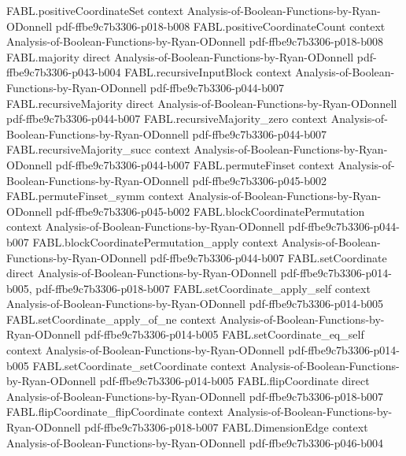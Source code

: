 \begin{theorem}
\proofstep
  {FABL.positiveCoordinateSet}
  {context}
  {Analysis-of-Boolean-Functions-by-Ryan-ODonnell}
  {pdf-ffbe9c7b3306-p018-b008}
\proofstep
  {FABL.positiveCoordinateCount}
  {context}
  {Analysis-of-Boolean-Functions-by-Ryan-ODonnell}
  {pdf-ffbe9c7b3306-p018-b008}
\proofstep
  {FABL.majority}
  {direct}
  {Analysis-of-Boolean-Functions-by-Ryan-ODonnell}
  {pdf-ffbe9c7b3306-p043-b004}
\proofstep
  {FABL.recursiveInputBlock}
  {context}
  {Analysis-of-Boolean-Functions-by-Ryan-ODonnell}
  {pdf-ffbe9c7b3306-p044-b007}
\proofstep
  {FABL.recursiveMajority}
  {direct}
  {Analysis-of-Boolean-Functions-by-Ryan-ODonnell}
  {pdf-ffbe9c7b3306-p044-b007}
\proofstep
  {FABL.recursiveMajority_zero}
  {context}
  {Analysis-of-Boolean-Functions-by-Ryan-ODonnell}
  {pdf-ffbe9c7b3306-p044-b007}
\proofstep
  {FABL.recursiveMajority_succ}
  {context}
  {Analysis-of-Boolean-Functions-by-Ryan-ODonnell}
  {pdf-ffbe9c7b3306-p044-b007}
\proofstep
  {FABL.permuteFinset}
  {context}
  {Analysis-of-Boolean-Functions-by-Ryan-ODonnell}
  {pdf-ffbe9c7b3306-p045-b002}
\proofstep
  {FABL.permuteFinset_symm}
  {context}
  {Analysis-of-Boolean-Functions-by-Ryan-ODonnell}
  {pdf-ffbe9c7b3306-p045-b002}
\proofstep
  {FABL.blockCoordinatePermutation}
  {context}
  {Analysis-of-Boolean-Functions-by-Ryan-ODonnell}
  {pdf-ffbe9c7b3306-p044-b007}
\proofstep
  {FABL.blockCoordinatePermutation_apply}
  {context}
  {Analysis-of-Boolean-Functions-by-Ryan-ODonnell}
  {pdf-ffbe9c7b3306-p044-b007}
\proofstep
  {FABL.setCoordinate}
  {direct}
  {Analysis-of-Boolean-Functions-by-Ryan-ODonnell}
  {pdf-ffbe9c7b3306-p014-b005,
    pdf-ffbe9c7b3306-p018-b007}
\proofstep
  {FABL.setCoordinate_apply_self}
  {context}
  {Analysis-of-Boolean-Functions-by-Ryan-ODonnell}
  {pdf-ffbe9c7b3306-p014-b005}
\proofstep
  {FABL.setCoordinate_apply_of_ne}
  {context}
  {Analysis-of-Boolean-Functions-by-Ryan-ODonnell}
  {pdf-ffbe9c7b3306-p014-b005}
\proofstep
  {FABL.setCoordinate_eq_self}
  {context}
  {Analysis-of-Boolean-Functions-by-Ryan-ODonnell}
  {pdf-ffbe9c7b3306-p014-b005}
\proofstep
  {FABL.setCoordinate_setCoordinate}
  {context}
  {Analysis-of-Boolean-Functions-by-Ryan-ODonnell}
  {pdf-ffbe9c7b3306-p014-b005}
\proofstep
  {FABL.flipCoordinate}
  {direct}
  {Analysis-of-Boolean-Functions-by-Ryan-ODonnell}
  {pdf-ffbe9c7b3306-p018-b007}
\proofstep
  {FABL.flipCoordinate_flipCoordinate}
  {context}
  {Analysis-of-Boolean-Functions-by-Ryan-ODonnell}
  {pdf-ffbe9c7b3306-p018-b007}
\proofstep
  {FABL.DimensionEdge}
  {context}
  {Analysis-of-Boolean-Functions-by-Ryan-ODonnell}
  {pdf-ffbe9c7b3306-p046-b004}

\end{theorem}

